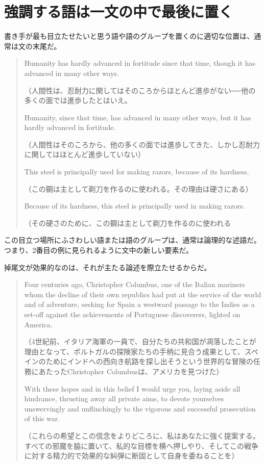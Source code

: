 \section{強調する語は一文の中で最後に置く}
書き手が最も目立たせたいと思う語や語のグループを置くのに適切な位置は、通常は文の末尾だ。
\begin{quote}
    Humanity has hardly advanced in fortitude since that time, though
it has advanced in many other ways.

（人間性は、忍耐力に関してはそのころからほとんど進歩がない──他の多くの面では進歩したとはいえ。

Humanity, since that time, has advanced in many other ways, but it
has hardly advanced in fortitude.

（人間性はそのころから、他の多くの面では進歩してきた、しかし忍耐力に関してはほとんど進歩していない）

This steel is principally used for making razors, because of its
hardness.

（この鋼は主として剃刀を作るのに使われる。その理由は硬さにある）

Because of its hardness, this steel is principally used in making
razors.

（その硬さのために、この鋼は主として剃刀を作るのに使われる
\end{quote}
この目立つ場所にふさわしい語または語のグループは、通常は論理的な述語だ。つまり、2番目の例に見られるように文中の新しい要素だ。
\par
掉尾文が効果的なのは、それが主たる論述を際立たせるからだ。
\begin{quote}
    Four centuries ago, Christopher Columbus, one of the Italian
mariners whom the decline of their own republics had put at the service
of the world and of adventure, seeking for Spain a westward passage to
the Indies as a set-off against the achievements of Portuguese
discoverers, lighted on America.

（4世紀前、イタリア海軍の一員で、自分たちの共和国が凋落したことが理由となって、ポルトガルの探険家たちの手柄に見合う成果として、スペインのためにインドへの西向き航路を探し出そうという世界的な冒険の任務にあたったChristopher
Columbusは、アメリカを見つけた）

With these hopes and in this belief I would urge you, laying aside
all hindrance, thrusting away all private aims, to devote yourselves
unswervingly and unflinchingly to the vigorous and successful
prosecution of this war.

（これらの希望とこの信念をよりどころに、私はあなたに強く提案する。すべての邪魔を脇に置いて、私的な目標を横へ押しやり、そしてこの戦争に対する精力的で効果的な糾弾に断固として自身を委ねることを）
\end{quote}

